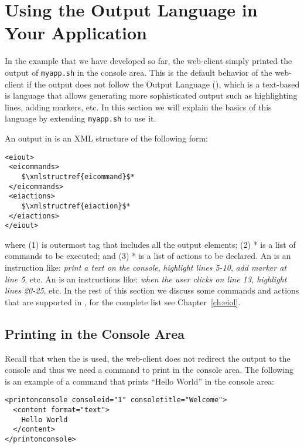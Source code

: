 \section{Using the \ei Output Language in Your Application}

In the example that we have developed so far, the web-client simply
printed the output of \texttt{myapp.sh} in the console area. This is
the default behavior of the web-client if the output does not follow
the \ei Output Language (\eiol), which is a text-based is language
that allows generating more sophisticated output such as highlighting
lines, adding markers, etc.
%
In this section we will explain the basics of this language by
extending \texttt{myapp.sh} to use it.

An output in \eiol is an XML structure of the following form:

\medskip
\noindent
\begin{lstlisting}
<eiout> 
 <eicommands>
    $\xmlstructref{eicommand}$*
 </eicommands>
 <eiactions>
    $\xmlstructref{eiaction}$*
 </eiactions>
</eiout>
\end{lstlisting}

\medskip
\noindent
where (1)  is outermost tag that includes all the output
elements; (2) * is a list of commands to be
executed; and (3) * is a list of actions to be
declared.
%
An  is an instruction like: \emph{print a text
  on the console}, \emph{highlight lines 5-10}, \emph{add marker at
  line 5}, etc.
%
An  is an instructions like: \emph{when the
  user clicks on line 13, highlight lines 20-25}, etc.
%
In the rest of this section we discuss some commands and actions that
are supported in \eiol, for the complete list see
Chapter~\ref{ch:eiol}.

\subsection{Printing in the Console Area}

Recall that when the \eiol is used, the web-client does not redirect
the output to the console and thus we need a command to
print in the console area.
%
The following is an example of a command that prints ``Hello World''
in the console area:

\medskip
\begin{lstlisting}
<printonconsole consoleid="1" consoletitle="Welcome">
  <content format="text">
    Hello World
  </content>
</printonconsole>
\end{lstlisting}

